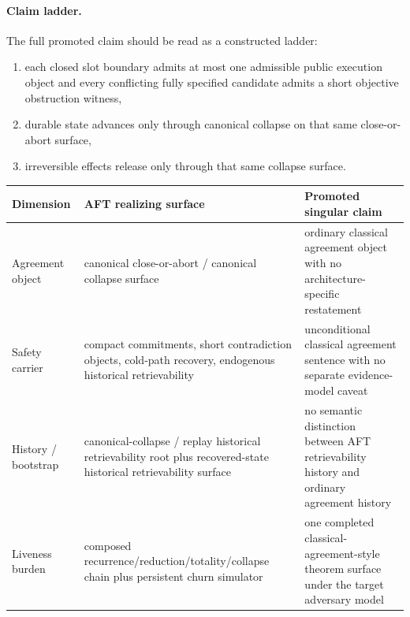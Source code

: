 \documentclass[11pt]{article}
\newcommand{\AFT}{\textsc{AFT}}
\begin{document}
\paragraph{Claim ladder.}
The full promoted claim should be read as a constructed ladder:
\begin{enumerate}[leftmargin=1.5em]
\item each closed slot boundary admits at most one admissible public execution
object and every conflicting fully specified candidate admits a short
objective obstruction witness,
\item durable state advances only through canonical collapse on that same
close-or-abort surface,
\item irreversible effects release only through that same collapse surface.
\end{enumerate}

\begin{center}
\small
\begin{tabularx}{\textwidth}{>{\raggedright\arraybackslash}p{} >{\raggedright\arraybackslash}p{} X}
\toprule
\textbf{Dimension} & \textbf{AFT realizing surface} & \textbf{Promoted singular claim} \\
\midrule
Agreement object & canonical close-or-abort / canonical collapse surface & ordinary classical agreement object with no architecture-specific restatement \\
Safety carrier & compact commitments, short contradiction objects, cold-path recovery, endogenous historical retrievability & unconditional classical agreement sentence with no separate evidence-model caveat \\
History / bootstrap & canonical-collapse / replay historical retrievability root plus recovered-state historical retrievability surface & no semantic distinction between \AFT{} retrievability history and ordinary agreement history \\
Liveness burden & composed recurrence/reduction/totality/collapse chain plus persistent churn simulator & one completed classical-agreement-style theorem surface under the target adversary model \\
\bottomrule
\end{tabularx}
\end{center}
\end{document}
